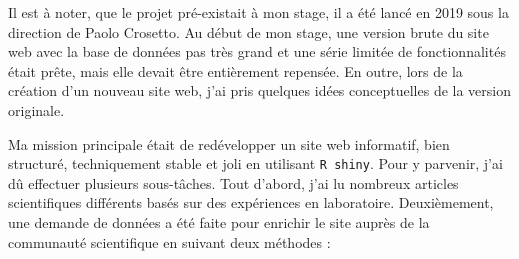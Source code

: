 \documentclass[12pt]{article}
\begin{document}
Il est à noter, que le projet pré-existait à mon stage, il a été lancé
en 2019 sous la direction de Paolo Crosetto. Au début de mon stage, une
version brute du site web avec la base de données pas très grand et une
série limitée de fonctionnalités était prête, mais elle devait être
entièrement repensée. En outre, lors de la création d'un nouveau site
web, j'ai pris quelques idées conceptuelles de la version originale.

Ma mission principale était de redévelopper un site web informatif, bien
structuré, techniquement stable et joli en utilisant \texttt{R\ shiny}.
Pour y parvenir, j'ai dû effectuer plusieurs sous-tâches. Tout d'abord,
j'ai lu nombreux articles scientifiques différents basés sur des
expériences en laboratoire. Deuxièmement, une demande de données a été
faite pour enrichir le site auprès de la communauté scientifique en
suivant deux méthodes :
\end{document}
